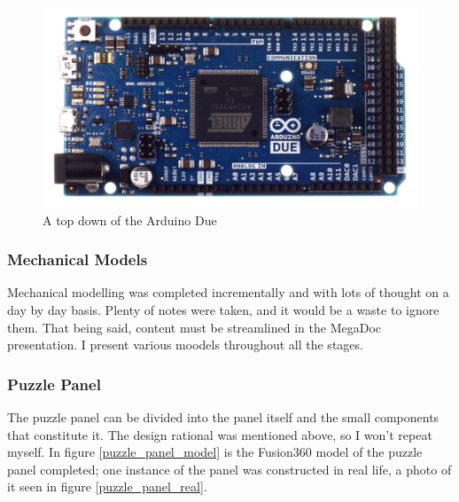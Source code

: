 \documentclass[a4paper, 10pt]{article}
\begin{document}
 		\begin{figure} [h]
			\centering
			\includegraphics[scale=0.2]{Photos/arduino_due}
			\caption{A top down of the Arduino Due}
			\label{arduino_due}
		\end{figure}
 
 		\subsubsection{Mechanical Models}
 		Mechanical modelling was completed incrementally and with lots of thought on a day by day basis. Plenty of notes were taken, and it would be a waste to ignore them. That being said, content must be streamlined in the MegaDoc presentation. I present various moodels throughout all the stages.
 		
 		\subsubsection*{Puzzle Panel}
		The puzzle panel can be divided into the panel itself and the small components that constitute it. The design rational was mentioned above, so I won't repeat myself. In figure \ref{puzzle_panel_model} is the Fusion360 model of the puzzle panel completed; one instance of the panel was constructed in real life, a photo of it seen in figure \ref{puzzle_panel_real}.
		
\end{document}
